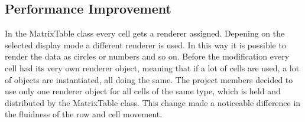 \subsection{Performance Improvement}

In the MatrixTable class every cell gets a renderer assigned. Depening on the selected display mode a different renderer is used. In this way it is possible to render the data as circles or numbers and so on. Before the modification every cell had its very own renderer object, meaning that if a lot of cells are used, a lot of objects are instantiated, all doing the same. The project members decided to use only one renderer object for all cells of the same type, which is held and distributed by the MatrixTable class. This change made a noticeable difference in the fluidness of the row and cell movement.